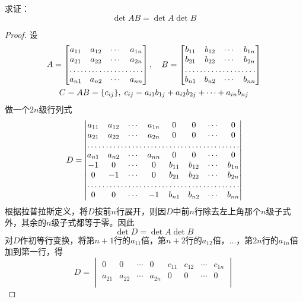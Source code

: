 \documentclass[twoside,openright]{book}
\begin{document}
\begin{CJK*}{UTF8}{}
\begin{quest}
\label{quest:77}
求证：
\[
\det{AB} = \det{A} \det{B}
\]
\end{quest}
\begin{proof}
设
\begin{gather*}
A=\begin{bmatrix} a_{11} & a_{12} & \cdots & a_{1n} \\
                a_{21} & a_{22} & \cdots & a_{2n} \\
                   \hdotsfor{4} \\
                a_{n1} & a_{n2} & \cdots & a_{nn} \end{bmatrix},\quad
B=\begin{bmatrix} b_{11} & b_{12} & \cdots & b_{1n} \\
                b_{21} & b_{22} & \cdots & b_{2n} \\
                   \hdotsfor{4} \\
                b_{n1} & b_{n2} & \cdots & b_{nn} \end{bmatrix} \\
C=AB=\{c_{ij}\},\;c_{ij}=a_{i1}b_{1j}+a_{i2}b_{2j}+\dotsb+a_{in}b_{nj}
\end{gather*}
做一个$2n$级行列式
\[
D=\begin{vmatrix} a_{11} & a_{12} & \cdots & a_{1n}  & 0 & 0 & \cdots & 0\\
                a_{21} & a_{22} & \cdots & a_{2n}  & 0 & 0 & \cdots & 0 \\
                   \hdotsfor{8} \\
                a_{n1} & a_{n2} & \cdots & a_{nn}  & 0 & 0 & \cdots & 0 \\
                 -1 & 0 & \cdots & 0 & b_{11} & b_{12} & \cdots & b_{1n} \\
                 0 & -1 & \cdots & 0 & b_{21} & b_{22} & \cdots & b_{2n} \\
                   \hdotsfor{8} \\
                 0 & 0 & \cdots & -1 & b_{n1} & b_{n2} & \cdots & b_{nn} \end{vmatrix}
\]
根据拉普拉斯定义，将$D$按前$n$行展开，则因$D$中前$n$行除去左上角那个$n$级子式外，其余的$n$级子式都等于零。因此
\[
\det D=\det A \det B\]
对$D$作初等行变换，将第$n+1$行的$a_{11}$倍，第$n+2$行的$a_{12}$倍，$\dotsc$，第$2n$行的$a_{1n}$倍加到第一行，得
\[
D=\begin{vmatrix} 0 & 0 & \cdots & 0  & c_{11} & c_{12} & \cdots & c_{1n}\\
                a_{21} & a_{22} & \cdots & a_{2n}  & 0 & 0 & \cdots & 0 \\

\end{vmatrix}\]
\end{proof}
\end{CJK*}
\end{document}
